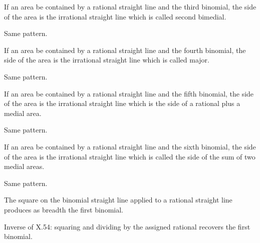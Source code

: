 \begin{claim}
\label{prop:X.56}
If an area be contained by a rational straight line and the third
binomial, the side of the area is the irrational straight line which
is called second bimedial.
\end{claim}
\begin{evidence}[Proof of X.56]
\label{ev:X.56}
Same pattern.
\end{evidence}

\begin{claim}
\label{prop:X.57}
If an area be contained by a rational straight line and the fourth
binomial, the side of the area is the irrational straight line which
is called major.
\end{claim}
\begin{evidence}[Proof of X.57]
\label{ev:X.57}
Same pattern.
\end{evidence}

\begin{claim}
\label{prop:X.58}
If an area be contained by a rational straight line and the fifth
binomial, the side of the area is the irrational straight line which
is the side of a rational plus a medial area.
\end{claim}
\begin{evidence}[Proof of X.58]
\label{ev:X.58}
Same pattern.
\end{evidence}

\begin{claim}
\label{prop:X.59}
If an area be contained by a rational straight line and the sixth
binomial, the side of the area is the irrational straight line which
is called the side of the sum of two medial areas.
\end{claim}
\begin{evidence}[Proof of X.59]
\label{ev:X.59}
Same pattern.
\end{evidence}

\begin{claim}
\label{prop:X.60}
The square on the binomial straight line applied to a rational
straight line produces as breadth the first binomial.
\end{claim}
\begin{evidence}[Proof of X.60]
\label{ev:X.60}
Inverse of X.54: squaring and dividing by the assigned rational
recovers the first binomial.
\end{evidence}

